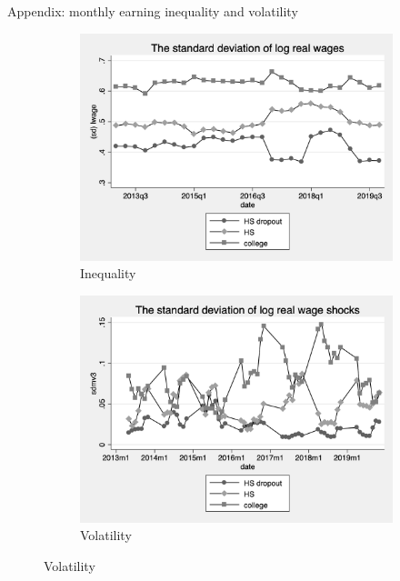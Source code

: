 \documentclass{beamer}
\begin{document}
\begin{frame}{Appendix: monthly earning inequality and volatility}
	\label{appendix:monthly_inequality_vol}
	\begin{figure}[ht]
	\centering
	\begin{subfigure}[b]{0.46\textwidth}
		\caption{Inequality}
		\includegraphics[width=\textwidth]{figures/log_wage_sd_by_edu.png}
	\end{subfigure}
	\begin{subfigure}[b]{0.46\textwidth}
		\caption{Volatility}
		\includegraphics[width=\textwidth]{figures/log_wage_shk_gr_sd_by_edu.png}
	\end{subfigure} 
\end{figure}
	\hyperlink{monthly_decomposition_compare}{} 
\end{frame}
\end{document}

